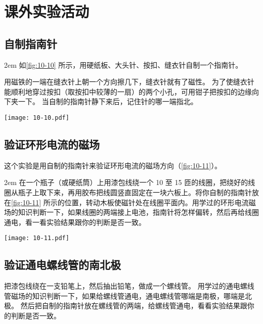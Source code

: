 
\chapter*{课外实验活动}
\setcounter{section}{0}
\section{自制指南针}

\medskip\noindent
\begin{minipage}{0.75\linewidth}\parindent2em
如\cref{fig:10-10} 所示，用硬纸板、大头针、按扣、缝衣针自制一个指南针。

用磁铁的一端在缝衣针上朝一个方向擦几下，缝衣针就有了磁性。
为了使缝衣针能顺利地穿过按扣（取按扣中较薄的一扇）的两个小孔，可用钳子把按扣的边缘向下夹一下。
当自制的指南针静下来后，记住针的哪一端指北。
\end{minipage}\hfill
\begin{minipage}{0.2\linewidth}\centering
\begin{figurehere}
  \texttt{[image: 10-10.pdf]}
  \caption{}\label{fig:10-10}
\end{figurehere}
\end{minipage}


\section{验证环形电流的磁场}
这个实验是用自制的指南针来验证环形电流的磁场方向（\cref{fig:10-11}）。

\medskip\noindent
\begin{minipage}{0.6\linewidth}\parindent2em
在一个瓶子（或硬纸筒）上用漆包线绕一个 10 至 15 匝的线圈，把绕好的线圈从瓶子上取下来，再用胶布把线圆竖直固定在一块六板上。将你自制的指南针放在\cref{fig:10-11} 所示的位置，转动木板使磁针处在线圈平面内。用学过的环形电流磁场的知识判断一下，如果线圈的两端接上电池，指南针将怎样偏转，然后再给线圈通电，看一看实验结果跟你的判断是否一致。
\end{minipage}\hfill
\begin{minipage}{0.38\linewidth}\centering
  \begin{figurehere}
    \texttt{[image: 10-11.pdf]}
    \caption{}\label{fig:10-11}
  \end{figurehere}
\end{minipage}

\section{验证通电螺线管的南北极}
把漆包线绕在一支铅笔上，然后抽出铅笔，做成一个螺线管。
用学过的通电螺线管磁场的知识判断一下，如果给螺线管通电，通电螺线管哪端是南极，哪端是北极。
然后把自制的指南针放在螺线管的两端，给螺线管通电，看看实验结果跟你的判断是否一致。

